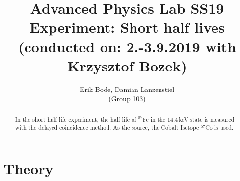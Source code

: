 \documentclass[30pt,a4paper]{article}
\title{
	\large Advanced Physics Lab	SS19 \\[4mm]
	\textbf{\LARGE Experiment: Short half lives
	} \\[4mm]
	(conducted on: 2.-3.9.2019 with Krzysztof Bozek) \\}
\author{Erik Bode, Damian Lanzenstiel \\ (Group 103)}
\begin{document}
	
	\begin{titlepage}
	\maketitle
	\vspace{2cm}
	\begin{abstract}
	In the short half life experiment, the half life of $^{57}$Fe in the $14.4$\,keV state is measured with the delayed coincidence method. As the source, the Cobalt Isotope $^{57}$Co is used.
	\end{abstract}
	\end{titlepage}
	\newpage
	
	\tableofcontents
	\newpage
	
	\section{Theory}
\end{document}
